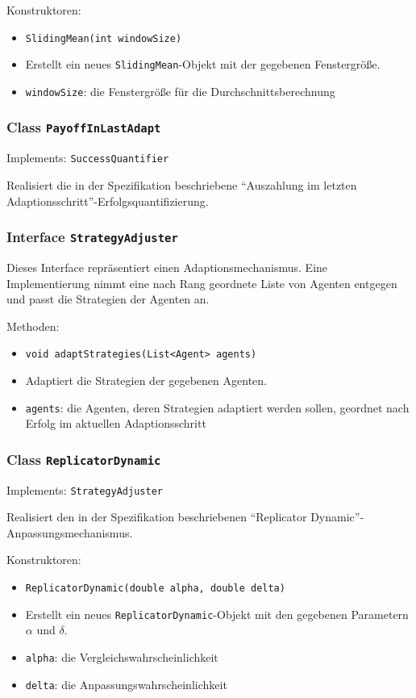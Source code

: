 \documentclass[parskip=full,11pt]{scrartcl}
\begin{document}
Konstruktoren:
\begin{itemize}\itemsep -10pt
\item \texttt{SlidingMean(int windowSize)}
\item[] Erstellt ein neues \texttt{SlidingMean}-Objekt mit der gegebenen Fenstergröße.
\item[] \texttt{windowSize}: die Fenstergröße für die Durchschnittsberechnung
\end{itemize}

\subsubsection{Class \texttt{PayoffInLastAdapt}}
Implements: \texttt{SuccessQuantifier}

Realisiert die in der Spezifikation beschriebene \enquote{Auszahlung im letzten Adaptionsschritt}-Erfolgsquantifizierung.

\subsubsection{Interface \texttt{StrategyAdjuster}}
Dieses Interface repräsentiert einen Adaptionsmechanismus. Eine Implementierung nimmt eine nach Rang geordnete Liste von Agenten entgegen und passt die Strategien der Agenten an.

Methoden:
\begin{itemize}\itemsep -10pt
\item \texttt{void adaptStrategies(List<Agent> agents)}
\item[] Adaptiert die Strategien der gegebenen Agenten.
\item[] \texttt{agents}: die Agenten, deren Strategien adaptiert werden sollen, geordnet nach Erfolg im aktuellen Adaptionsschritt
\end{itemize}

\subsubsection{Class \texttt{ReplicatorDynamic}}
Implements: \texttt{StrategyAdjuster}

Realisiert den in der Spezifikation beschriebenen \enquote{Replicator Dynamic}-Anpassungsmechanismus.

Konstruktoren:
\begin{itemize}\itemsep -10pt
\item \texttt{ReplicatorDynamic(double alpha, double delta)}
\item[] Erstellt ein neues \texttt{ReplicatorDynamic}-Objekt mit den gegebenen Parametern \(\alpha\) und \(\delta\).
\item[] \texttt{alpha}: die Vergleichswahrscheinlichkeit
\item[] \texttt{delta}: die Anpassungswahrscheinlichkeit
\end{itemize}
\end{document}
